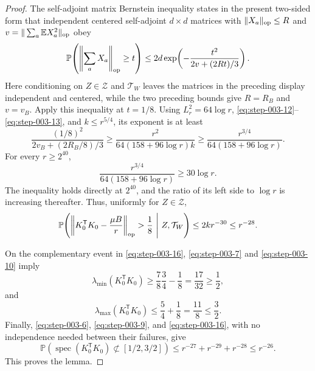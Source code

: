 \begin{proof}
The self-adjoint matrix Bernstein inequality
\citep[Theorem~6.1]{tropp2012} states in the present two-sided form that
independent centered self-adjoint \(d\times d\) matrices with
\(\|X_a\|_{\rm op}\le R\) and
\(v=\|\sum_a\mathbb EX_a^2\|_{\rm op}\) obey
\[
  \mathbb P\!\left(\left\|\sum_aX_a\right\|_{\rm op}\ge t\right)
  \le 2d\exp\!\left(-\frac{t^2}{2v+(2Rt)/3}\right).
\]
Here conditioning on \(Z\in\mathcal Z\) and \(\mathcal T_W\) leaves the
matrices in the preceding display independent and centered, while the two
preceding bounds give \(R=R_B\) and \(v=v_B\).  Apply this inequality at
\(t=1/8\).
Using \(L_r^2=64\log r\), \eqref{eq:step-003-12}--\eqref{eq:step-003-13}, and
\(k\le r^{5/4}\), its exponent is at least
\begin{equation}
  \frac{(1/8)^2}{2v_B+(2R_B/8)/3}
  \ge\frac{r^2}{64(158+96\log r)k}
  \ge\frac{r^{3/4}}{64(158+96\log r)}.                    \label{eq:step-003-14}
\end{equation}
For every \(r\ge2^{40}\),
\begin{equation}
  \frac{r^{3/4}}{64(158+96\log r)}\ge30\log r.            \label{eq:step-003-15}
\end{equation}
The inequality holds directly at \(2^{40}\), and the ratio of its left side
to \(\log r\) is increasing thereafter. Thus, uniformly for
\(Z\in\mathcal Z\),
\begin{equation}
  \mathbb P\!\left(
    \left\|K_0^{\mathsf T}K_0-\frac{\mu B}{r}\right\|_{\rm op}
      >\frac18
    \ \middle|\ Z,\mathcal T_W
  \right)
  \le2kr^{-30}\le r^{-28}.                                \label{eq:step-003-16}
\end{equation}

On the complementary event in \eqref{eq:step-003-16}, \eqref{eq:step-003-7} and \eqref{eq:step-003-10} imply
\begin{equation}
  \lambda_{\min}(K_0^{\mathsf T}K_0)
  \ge\frac78\frac34-\frac18
  =\frac{17}{32}\ge\frac12,                               \label{eq:step-003-17}
\end{equation}
and
\begin{equation}
  \lambda_{\max}(K_0^{\mathsf T}K_0)
  \le\frac54+\frac18
  =\frac{11}{8}\le\frac32.                                \label{eq:step-003-18}
\end{equation}
Finally, \eqref{eq:step-003-6}, \eqref{eq:step-003-9}, and \eqref{eq:step-003-16}, with no independence needed between their
failures, give
\[
  \mathbb P\!\left(
    \operatorname{spec}(K_0^{\mathsf T}K_0)
      \not\subset[1/2,3/2]
  \right)
  \le r^{-27}+r^{-29}+r^{-28}
  \le r^{-26}.
\]
This proves the lemma. 

\end{proof}



